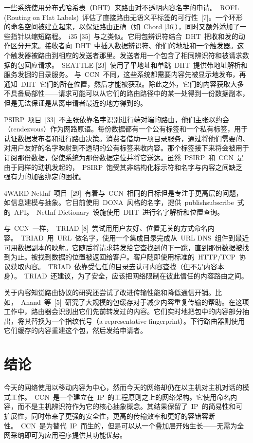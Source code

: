 一些系统使用分布式哈希表（DHT）来路由对不透明内容名字的申请。~ROFL (Routing on Flat Labels)~评估了直接路由无语义平标签的可行性~[7]。一个环形的命名空间被建立起来，以保证路由正确（如~Chord [36]），同时又额外添加了一些指针以缩短路程。~i35 [35]~与之类似。它用包辨识符结合~DHT~把收和发的动作区分开来。接收者向~DHT~中插入数据辨识符、他们的地址和一个触发器。这个触发器被路由到相应的发送者那里。发送者用一个包含了相同辨识符和被请求数据的包回应请求。~SEATTLE [23]~使用了平地址和单跳~DHT~提供带地址解析和服务发掘的目录服务。%
与~CCN~不同，这些系统都需要内容先被显示地发布，再通知~DHT~它们的所在位置，然后才能被获取。除此之外，它们的内容获取大多不具备局部性——请求可能可以从它们的路由路径中的某一处得到一份数据副本，但是无法保证是从离申请者最近的地方得到的。

PSIRP~项目~[33]~不主张依靠名字识别进行端对端的路由，他们主张以约会（rendezvous）作为网路原语。每份数据都有一个公有标签和一个私有标签，用于认证数据发布者和进行路由决策。消费者借助一项目录服务，通过将他们需要的、对用户友好的名字映射到不透明的公有标签来收内容。那个标签接下来将会被用于订阅那份数据，促使系统为那份数据定位并将它送达。虽然~PSIRP~和~CCN~是由于同样的动机发起的，~PSIRP~饱受其非结构化标示符和名字与内容之间缺乏强有力的加密绑定的困扰。

4WARD NetInf~项目~[29]~有着与~CCN~相同的目标但是专注于更高层的问题，如信息建模与抽象。它目前使用~DONA~风格的名字，提供~publish\/subscribe~式的~API。~NetInf Dictionary~设施使用~DHT~进行名字解析和位置查询。

与~CCN~一样，~TRIAD [8]~尝试用用户友好、位置无关的方式命名内容。~TRIAD~用~URL~做名字，使用一个集成目录完成从~URL DNS~组件到最近可用数据副本的映射。它随后将请求转发给它查找到的下一跳，直到那份数据被找到为止。被找到数据的位置被返回给客户。客户随即使用标准的~HTTP/TCP~协议获取内容。~TRIAD~依靠受信任的目录去认可内容查找（但不是内容本身）。~TRIAD~还建议，为了安全，应该把网络限制在彼此信任的内容路由之间。

关于内容知觉路由协议的研究还尝试了改进传输性能和降低通信开销。比如，~Anand~等~[5]~研究了大规模的包缓存对于减少内容重复传输的帮助。在这项工作中，路由器会识别出它们先前转发过的内容。它们实时地把包中的内容部分抽出，将其替换为一个指纹代号（a representative fingerprint）。下行路由器则使用它们缓存的内容重建这个包，然后发给申请者。

\section{结论}
\label{sec:8}
今天的网络使用以移动内容为中心，然而今天的网络却仍在以主机对主机对话的模式工作。~CCN~是一个建立在~IP~的工程原则之上的网络架构。它使用命名内容，而不是主机辨识符作为它的核心抽象概念。其结果保留了~IP~的简易性和可扩展性，同时带来了更强的安全性，更高的传输效率和更好的容错容断性。~CCN~是为替代~IP~而生的，但是可以从一个叠加层开始生长——无需为全网采纳即可为应用程序提供其功能优势。

